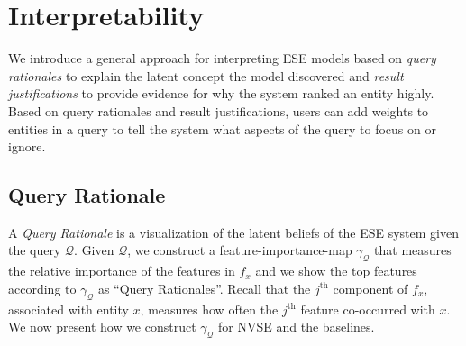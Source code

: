 \documentclass[a4paper]{article}
\newcommand{\secref}[1]{\S~\ref{#1}}
\newcommand{\ath}[1]{#1^{\textrm{th}}}
\newcommand{\cQ}{\mathcal{Q}}
\newcommand{\er}{ESE\xspace}
\newcommand{\nvge}{NVSE\xspace}
\begin{document}
\section{Interpretability}
\label{sec:query-rational}
We introduce a general approach %
for interpreting \er models
based on \textit{query rationales} to explain the latent concept the model discovered
and \textit{result justifications} to provide evidence %
for why the system ranked an entity highly. %
%
Based on query rationales and result justifications, users can add weights to entities
in a query %
to tell the system what aspects of the
query to focus on or ignore. %

\subsection{Query Rationale}
A \textit{Query Rationale} is a visualization of the latent beliefs of the \er system given the query $\cQ$. 
Given $\cQ$, we construct a feature-importance-map $\gamma_{\cQ}$ that measures the relative importance of the features
in $f_x$ and we show the top features according to $\gamma_\cQ$ as ``Query Rationales''. Recall that the $\ath{j}$ component of $f_x$, associated with entity $x$, measures how often the $\ath{j}$ feature co-occurred with $x$. We now present how we construct $\gamma_\cQ$ for 
\nvge and the baselines. %
\end{document}
